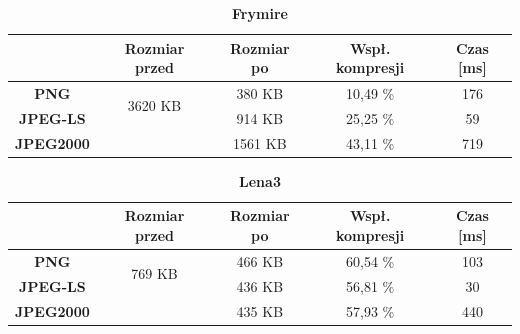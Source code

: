 \begin{table}[!h]
	\centering
	\caption{\textbf{Frymire}}
	\label{my-label}
	\begin{tabular}{|c|c|c|c|c|}                                             
		\hline
		& \textbf{Rozmiar przed} & \textbf{Rozmiar po} & \textbf{Wspł. kompresji} & \textbf{Czas {[}ms{]}} \\ \hline 
		\textbf{PNG}      &          \multicolumn{1}{c|}{\multirow{2}{*}{3620 KB}}             &         380 KB              &        10,49 \%                   &            176                 \\\cline{3-5}
		\textbf{JPEG-LS}  &                        &        914 KB             &         25,25 \%                 &           59               \\\cline{3-5}
		\textbf{JPEG2000} &                        &         1561 KB               &          43,11 \%                &       719               \\ \hline
	\end{tabular}
\end{table}

\begin{table}[!h]
	\centering
	\caption{\textbf{Lena3}}
	\label{my-label}
	\begin{tabular}{|c|c|c|c|c|}                                             
		\hline
		& \textbf{Rozmiar przed} & \textbf{Rozmiar po} & \textbf{Wspł. kompresji} & \textbf{Czas {[}ms{]}} \\ \hline 
		\textbf{PNG}      &          \multicolumn{1}{c|}{\multirow{2}{*}{769 KB}}             &      466 KB               &        60,54 \%                  &         103                    \\\cline{3-5}
		\textbf{JPEG-LS}  &                        &         436 KB            &      56,81 \%                   &         30                 \\\cline{3-5}
		\textbf{JPEG2000} &                        &     435 KB             &         57,93 \%                 &       440               \\ \hline
	\end{tabular}
\end{table}

